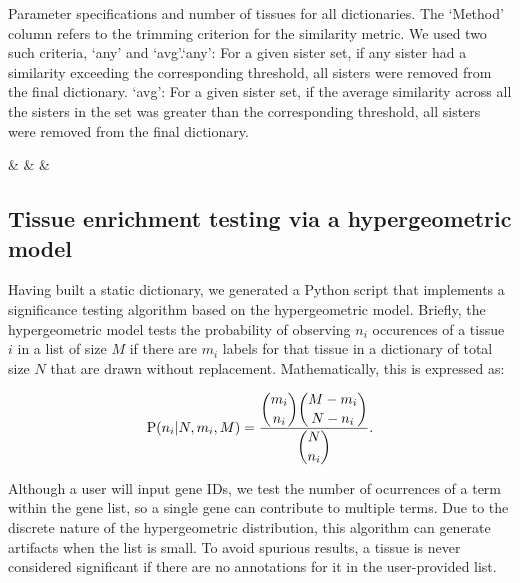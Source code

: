 \begin{table}[p]
	\caption{
	Parameter specifications and number of tissues for all dictionaries. The
  `Method' column refers to the trimming criterion for the similarity metric.
  We used two such criteria, `any' and `avg'.`any': For a given sister set, if
  any sister had a similarity exceeding the corresponding threshold, all sisters
  were removed from the final dictionary. `avg': For a given sister set, if the
  average similarity across all the sisters in the set was greater than the
  corresponding threshold, all sisters were removed from the final dictionary.
	}
	{\csvcoli & \csvcolii & \csvcoliii & \csvcoliv}

\label{tab:DictionarySpecs}
\end{table}

\subsection*{Tissue enrichment testing via a hypergeometric model}
Having built a static dictionary, we generated a Python script that implements a
significance testing algorithm based on the hypergeometric model. Briefly, the
hypergeometric model tests the probability of observing $n_i$ occurences of a
tissue $i$ in a list of size $M$ if there are $m_i$ labels for that tissue in a
dictionary of total size $N$ that are drawn without replacement. Mathematically,
this is expressed as:

\begin{eqnarray}\label{hypergeometric}
	\mathrm{P}(n_i | N, m_i, M) = \frac{\dbinom{m_i}{n_i}
  \dbinom{M-m_i}{N - n_i}}{\dbinom{N}{n_i}}\text{.}
\end{eqnarray}

Although a user will input gene IDs, we test the number of ocurrences of a term
within the gene list, so a single gene can contribute to multiple terms. Due to
the discrete nature of the hypergeometric distribution, this algorithm can
generate artifacts when the list is small. To avoid spurious results, a tissue is
never considered significant if there are no annotations for it in the
user-provided list.

